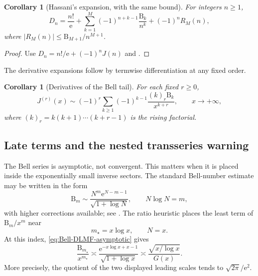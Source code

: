 \documentclass[11pt,oneside]{article}
\theoremstyle{plain}
\newtheorem{corollary}[theorem]{Corollary}
\theoremstyle{definition}
\theoremstyle{remark}
\newcommand{\ee}{\mathrm{e}}
\newcommand{\Bell}{\mathrm{B}}
\newcommand{\abs}[1]{\left\lvert#1\right\rvert}
\begin{document}
\begin{corollary}[Hassani's expansion, with the same bound]
\label{cor:Hassani}
For integers \(n\ge1\),
\begin{equation}
 D_n=\frac{n!}{\ee}
 +\sum_{k=1}^{M}(-1)^{n+k-1}\frac{\Bell_k}{n^k}
 +(-1)^nR_M(n),
 \label{eq:Hassani-recovered}
\end{equation}
where \(\abs{R_M(n)}\le\Bell_{M+1}/n^{M+1}\).
\end{corollary}
\begin{proof}
Use \(D_n=n!/\ee+(-1)^nJ(n)\) and
.
\end{proof}

The derivative expansions follow by termwise differentiation at any fixed
order.

\begin{corollary}[Derivatives of the Bell tail]
\label{cor:J-derivative-expansion}
For each fixed \(r\ge0\),
\begin{equation}
 J^{(r)}(x)\sim
 (-1)^r\sum_{k\ge1}(-1)^{k-1}
 \frac{(k)_r\Bell_k}{x^{k+r}},
 \qquad x\to+\infty,
 \label{eq:J-derivative-expansion}
\end{equation}
where \((k)_r=k(k+1)\cdots(k+r-1)\) is the rising factorial.
\end{corollary}

\subsection{Late terms and the nested transseries warning}
\label{subsec:Bell-late-terms}

The Bell series is asymptotic, not convergent.  This matters when it is placed
inside the exponentially small inverse sectors.  The standard Bell-number
estimate may be written in the form
\begin{equation}
 \Bell_m\sim
 \frac{N^m\ee^{N-m-1}}{\sqrt{1+\log N}},
 \qquad N\log N=m,
 \label{eq:Bell-DLMF-asymptotic}
\end{equation}
with higher corrections available; see \cite{DLMF26,MoserWyman1955}.  The
ratio heuristic places the least term of \(\Bell_m/x^m\) near
\begin{equation}
 m_\star=x\log x,
 \qquad N=x.
 \label{eq:Bell-optimal-index}
\end{equation}
At this index, \eqref{eq:Bell-DLMF-asymptotic} gives
\begin{equation}
 \frac{\Bell_{m_\star}}{x^{m_\star}}
 \asymp \frac{\ee^{-x\log x+x-1}}{\sqrt{1+\log x}}
 \asymp
 \frac{\sqrt{x/\log x}}{G(x)}.
 \label{eq:Bell-least-term-scale}
\end{equation}
More precisely, the quotient of the two displayed leading scales tends to
\(\sqrt{2\pi}/\ee^2\).
\end{document}
